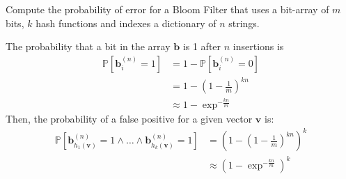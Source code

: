 \exercise

Compute the probability of error for a Bloom Filter that uses a bit-array of $m$
bits, $k$ hash functions and indexes a dictionary of $n$ strings.

\solution

The probability that a bit in the array $\mathbf{b}$ is 1 after $n$ insertions
is
%
\begin{align*}
  \mathbb{P}[\mathbf{b}_i^{(n)} = 1] &= 1 - \mathbb{P}[\mathbf{b}_i^{(n)} = 0]\\
  &= 1 - \left( 1 - \frac{1}{m} \right)^{kn} \\
  &\approx 1 - \exp^{-\frac{kn}{m}}
\end{align*}
%
Then, the probability of a false positive for a given vector $\mathbf{v}$ is:
%
\begin{align*}
  \mathbb{P}[\mathbf{b}_{h_1(\mathbf{v})}^{(n)} = 1 \wedge \dots \wedge
  \mathbf{b}_{h_k(\mathbf{v})}^{(n)} = 1] &= \left(1 - \left( 1 - \frac{1}{m}
  \right)^{kn} \right)^k \\ &\approx \left(1 - \exp^{-\frac{kn}{m}} \right)^k
\end{align*}
